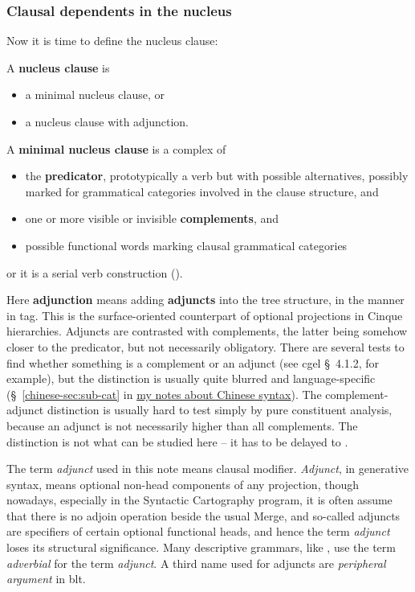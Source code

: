 \documentclass{article}
\newcommand*{\citesec}[1]{\S~{#1}}
\newcommand*{\concept}[1]{\textbf{#1}}
\newcommand*{\term}[1]{\emph{#1}}
\newcommand{\chinese}{\href{../Chinese/main.pdf}{my notes about Chinese syntax}}
\begin{document}
\subsubsection{Clausal dependents in the nucleus}\label{sec:nucleus-dependents}

Now it is time to define the nucleus clause:
\begin{exe}
    \ex\label{ex:nucleus-def} A \concept{nucleus clause} is 
    \begin{itemize}
        \item a minimal nucleus clause, or 
        \item a nucleus clause with adjunction.
    \end{itemize}
    \ex\label{ex:minimal-nucleus-def} A \concept{minimal nucleus clause} is a complex of 
    \begin{itemize}
        \item the \concept{predicator}, 
        prototypically a verb but with possible alternatives,
        possibly marked for grammatical categories involved in the clause structure, and 
        \item one or more visible or invisible \concept{complements}, and 
        \item possible functional words marking clausal grammatical categories
    \end{itemize}
    or it is a serial verb construction ().
\end{exe} 
Here \concept{adjunction} means adding \concept{adjuncts} into the tree structure, 
in the manner in \ac{tag}.
This is the surface-oriented counterpart of optional projections in Cinque hierarchies.
Adjuncts are contrasted with complements,
the latter being somehow closer to the predicator, 
but not necessarily obligatory.
There are several tests to find whether something is a complement or an adjunct
(see \ac{cgel} \citesec{4.1.2}, for example),
but the distinction is usually quite blurred and language-specific 
(\citesec{\ref{chinese-sec:sub-cat}} in \chinese).
The complement-adjunct distinction is usually hard to test simply by pure constituent analysis,
because an adjunct is not necessarily higher than all complements.
The distinction is not what can be studied here -- 
it has to be delayed to .

The term \term{adjunct} used in this note means clausal modifier.
\term{Adjunct}, in generative syntax, 
means optional non-head components of any projection,
though nowadays, especially in the Syntactic Cartography program, 
it is often assume that there is no adjoin operation beside the usual Merge,
and so-called adjuncts are specifiers of certain optional functional heads,
and hence the term \term{adjunct} loses its structural significance.
Many descriptive grammars, like \citep{quirk2010comprehensive}, 
use the term \term{adverbial} for the term \term{adjunct}.
A third name used for adjuncts are \term{peripheral argument} in \ac{blt}.
\end{document}
